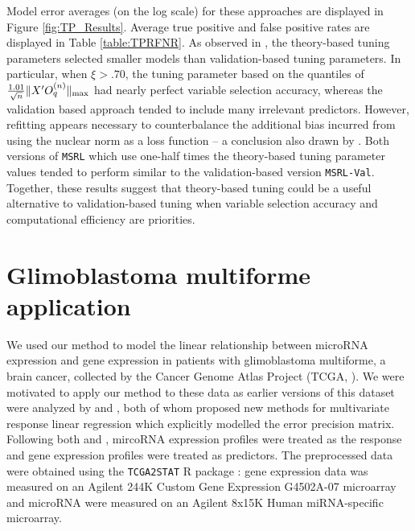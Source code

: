 \documentclass[12pt]{article}
\begin{document}
Model error averages (on the log scale) for these approaches are displayed in Figure \ref{fig:TP_Results}. Average true positive and false positive rates are displayed in Table \ref{table:TPRFNR}. As observed in \citet{belloni2011square}, the theory-based tuning parameters selected smaller models than validation-based tuning parameters. In particular, when $\xi > .70$, the tuning parameter based on the quantiles of $\frac{1.01}{\sqrt{n}}\|X'O^{(n)}_q\|_{\rm max}$ had nearly perfect variable selection accuracy, whereas the validation based approach tended to include many irrelevant predictors. However, refitting appears necessary to counterbalance the additional bias incurred from using the nuclear norm as a loss function -- a conclusion also drawn by \citet{belloni2011square}. Both versions of \texttt{MSRL} which use one-half times the theory-based tuning parameter values tended to perform similar to the validation-based version \texttt{MSRL-Val}. Together, these results suggest that theory-based tuning could be a useful alternative to validation-based tuning when variable selection accuracy and computational efficiency are priorities. 


\section{Glimoblastoma multiforme application}
We used our method to model the linear relationship between microRNA expression and gene expression in patients with glimoblastoma multiforme, a brain cancer, collected by the Cancer Genome Atlas Project (TCGA, \citet{weinstein2013cancer}). We were motivated to apply our method to these data as earlier versions of this dataset were analyzed by \citet{wang2015joint} and \citet{lee2012simultaneous}, both of whom proposed new methods for multivariate response linear regression which explicitly modelled the error precision matrix. Following both \citet{wang2015joint} and \citet{lee2012simultaneous}, mircoRNA expression profiles were treated as the response and gene expression profiles were treated as predictors. The preprocessed data were obtained using the \texttt{TCGA2STAT} R package \citep{wan2015tcga2stat}: gene expression data was measured on an Agilent 244K Custom Gene Expression G4502A-07 microarray and microRNA were measured on an Agilent 8x15K Human miRNA-specific microarray. 
\end{document}
